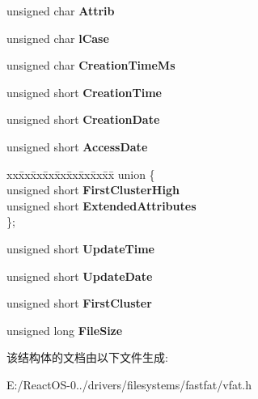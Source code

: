 \begin{DoxyCompactItemize}
\begin{tabbing}
\end{tabbing}\item 
\mbox{\label{struct___f_a_t_dir_entry_ae3133750cd985323342c5cd40dff5166}} 
unsigned char {\bfseries Attrib}
\item 
\mbox{\label{struct___f_a_t_dir_entry_aae7f86927b69f890d5cf024a7ff6c9c9}} 
unsigned char {\bfseries l\+Case}
\item 
\mbox{\label{struct___f_a_t_dir_entry_a02122d920b52ed8138f2a4ff7faabb16}} 
unsigned char {\bfseries Creation\+Time\+Ms}
\item 
\mbox{\label{struct___f_a_t_dir_entry_a7bda03c40cbc0573fda9f0f8ba74b45f}} 
unsigned short {\bfseries Creation\+Time}
\item 
\mbox{\label{struct___f_a_t_dir_entry_a3bf86174d7f4bb275e606c207e3b182e}} 
unsigned short {\bfseries Creation\+Date}
\item 
\mbox{\label{struct___f_a_t_dir_entry_af87012082386ab54b5d6a04f78b17c48}} 
unsigned short {\bfseries Access\+Date}
\item 
\mbox{\label{struct___f_a_t_dir_entry_a3f587a1640cd8b8e92b6bb5b11774f58}} 
\begin{tabbing}
xx\=xx\=xx\=xx\=xx\=xx\=xx\=xx\=xx\=\kill
union \{\\
\>unsigned short {\bfseries FirstClusterHigh}\\
\>unsigned short {\bfseries ExtendedAttributes}\\
\}; \\

\end{tabbing}\item 
\mbox{\label{struct___f_a_t_dir_entry_adeb29064b39e81054ebfe5a18a4ec30a}} 
unsigned short {\bfseries Update\+Time}
\item 
\mbox{\label{struct___f_a_t_dir_entry_a1a4a448b1b4eeb826268be14d1de7d41}} 
unsigned short {\bfseries Update\+Date}
\item 
\mbox{\label{struct___f_a_t_dir_entry_a64302d2f342fdc7a1df4c4bc892670fb}} 
unsigned short {\bfseries First\+Cluster}
\item 
\mbox{\label{struct___f_a_t_dir_entry_a3f9f5238193fe9b5e57047f0c0908174}} 
unsigned long {\bfseries File\+Size}
\end{DoxyCompactItemize}


该结构体的文档由以下文件生成\+:\begin{DoxyCompactItemize}
\item 
E\+:/\+React\+O\+S-\/0../drivers/filesystems/fastfat/vfat.\+h\end{DoxyCompactItemize}

